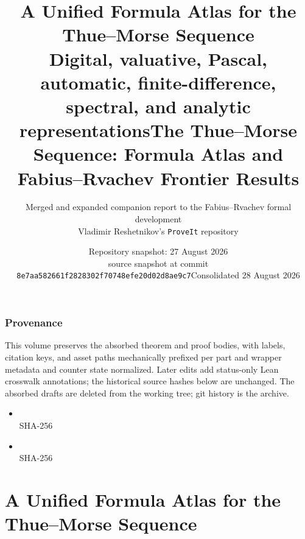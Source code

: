 \documentclass[11pt,oneside]{article}
\title{\bfseries A Unified Formula Atlas for the Thue--Morse Sequence\\[0.35em]
\large Digital, valuative, Pascal, automatic, finite-difference, spectral, and analytic representations}
\author{Merged and expanded companion report to the Fabius--Rvachev formal development\\
\small Vladimir Reshetnikov's \texttt{ProveIt} repository}
\date{Repository snapshot: 27 August 2026\\
\small source snapshot at commit \nolinkurl{8e7aa582661f2828302f70748efe20d02d8ae9c7}}
\title{\bfseries The Thue--Morse Sequence: Formula Atlas and Fabius--Rvachev Frontier Results}
\author{}
\date{Consolidated 28 August 2026}
\numberwithin{equation}{section}
\theoremstyle{definition}
\theoremstyle{remark}
\begin{document}
\maketitle
\tableofcontents
\clearpage
\section*{Provenance}
This volume preserves the absorbed theorem and proof bodies, with labels, citation keys,
and asset paths mechanically prefixed per part and wrapper metadata and counter state
normalized.  Later edits add status-only Lean crosswalk annotations; the historical source
hashes below are unchanged.
The absorbed drafts are deleted from the working tree; git history is the archive.
\begin{itemize}
\item {} \\ {\footnotesize SHA-256 }
\item {} \\ {\footnotesize SHA-256 }
\end{itemize}
\clearpage
\part{A Unified Formula Atlas for the Thue--Morse Sequence}
\end{document}
